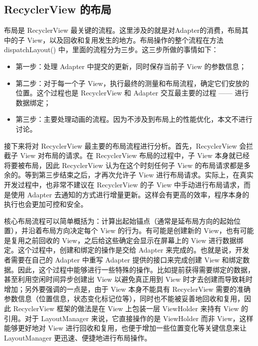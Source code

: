 \subsection{RecyclerView 的布局}

布局是 RecyclerView 最关键的流程。这里涉及的就是对Adapter的消费，布局其中的子 View，以及回收和复用发生的地方。布局操作的整个流程在方法 dispatchLayout() 中，里面的流程分为三步。这三步所做的事情如下：

\begin{itemize}
    \item 第一步：处理 Adapter 中提交的更新，同时保存当前子 View 的参数信息；
    \item 第二步：对于每一个子 View，执行最终的测量和布局流程，确定它们安放的位置。这个过程也是 RecyclerView 和 Adapter 交互最主要的过程 —— 进行数据绑定；
    \item 第三步：主要处理动画的流程。因为不涉及到布局上的性能优化，本文不进行讨论。
\end{itemize}

接下来将对 RecyclerView 最主要的布局流程进行分析。首先，RecyclerView 会拦截子 View 对布局的请求。在 RecyclerView 布局的过程中，子 View 本身就已经将要被布局，因此 RecyclerView 认为在这个时刻任何子 View 的布局请求都是多余的。等到第三步结束之后，才再次允许子 View 进行布局请求。实际上，在真实开发过程中，也非常不建议在 RecyclerView 的子 View 中手动进行布局请求，而是使用 Adapter 去通知的方式进行增量更新。这样会有更高的效率，程序本身的执行也会更加可控和安全。

核心布局流程可以简单概括为：计算出起始锚点（通常是延布局方向的起始位置），并沿着布局方向决定每个 View 的行为。有可能是创建新的 View，也有可能是复用之前回收的 View，之后给这些确定会显示在屏幕上的 View 进行数据绑定。这个过程中，创建和绑定的操作是交给 Adapter 来完成的。也就是说，开发者需要在自己的 Adapter 中重写 Adapter 提供的接口来完成创建 View 和绑定数据。因此，这个过程中能够进行一些特殊的操作。比如提前获得需要绑定的数据，甚至利用空闲时间异步创建出 View 以避免真正用到 View 时才去创建而导致耗时增加；另外要强调的一点是，由于 View 本身不能具有 RecyclerView 需要的准确参数信息（位置信息，状态变化标记位等），同时也不能被妥善地回收和复用，因此 RecyclerView 框架的做法是在 View 上包装一层 ViewHolder 来持有 View 的引用。对于 LayoutManager 来说，它直接操作的是 ViewHolder 而非 View，这样能够更好地对 View 进行回收和复用，也便于增加一些位置变化等关键信息来让 LayoutManager 更迅速、便捷地进行布局操作。


